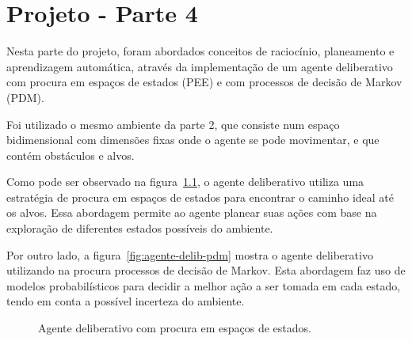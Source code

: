 \chapter{Projeto - Parte 4}\label{ch:projeto-parte4}

Nesta parte do projeto, foram abordados conceitos de raciocínio, planeamento e aprendizagem automática, através da implementação de um agente deliberativo com procura em espaços de estados (PEE) e com processos de decisão de Markov (PDM).

Foi utilizado o mesmo ambiente da parte 2, que consiste num espaço bidimensional com dimensões fixas onde o agente se pode movimentar, e que contém obstáculos e alvos.

Como pode ser observado na figura~\ref{fig:agente-delib-pee}, o agente deliberativo utiliza uma estratégia de procura em espaços de estados para encontrar o caminho ideal até os alvos.
Essa abordagem permite ao agente planear suas ações com base na exploração de diferentes estados possíveis do ambiente.

Por outro lado, a figura~\ref{fig:agente-delib-pdm} mostra o agente deliberativo utilizando na procura processos de decisão de Markov.
Esta abordagem faz uso de modelos probabilísticos para decidir a melhor ação a ser tomada em cada estado, tendo em conta a possível incerteza do ambiente.

\begin{figure}[H]
    \begin{center}
    \end{center}
    \caption{Agente deliberativo com procura em espaços de estados.}
    \label{fig:agente-delib-pee}
\end{figure}

